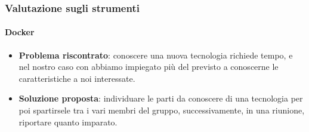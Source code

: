     \subsubsection{Valutazione sugli strumenti}
    
        \paragraph{Docker}
            \begin{itemize}
                \item \textbf{Problema riscontrato}: conoscere una nuova tecnologia richiede tempo, e nel nostro caso con  abbiamo impiegato più del previsto a conoscerne le caratteristiche a noi interessate.
                \item \textbf{Soluzione proposta}: individuare le parti da conoscere di una tecnologia per poi spartirsele tra i vari membri del gruppo, successivamente, in una riunione, riportare quanto imparato.
            \end{itemize}
    
    
		
		
		
